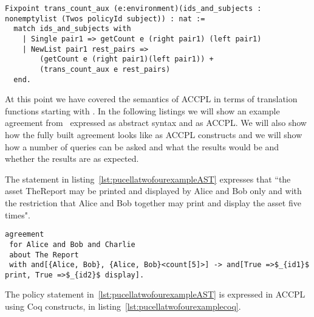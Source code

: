 \begin{minipage}[c]{0.95\textwidth}
\begin{lstlisting}
Fixpoint trans_count_aux (e:environment)(ids_and_subjects : nonemptylist (Twos policyId subject)) : nat :=
  match ids_and_subjects with
	| Single pair1 => getCount e (right pair1) (left pair1)
	| NewList pair1 rest_pairs =>
	    (getCount e (right pair1)(left pair1)) +
	    (trans_count_aux e rest_pairs)
  end.
\end{lstlisting}
\end{minipage}


At this point we have covered the semantics of \ac{ACCPL} in terms of translation functions starting with . In the following listings we will show an example agreement from~\cite{pucella2006} expressed as abstract syntax and as \ac{ACCPL}. We will also show how the fully built agreement looks like as \ac{ACCPL} constructs and we will show how a number of queries can be asked and what the results would be and whether the results are as expected.

The statement in listing~\ref{lst:pucellatwofourexampleAST} expresses that ``the asset TheReport may be printed and displayed by Alice and Bob only and with the restriction that Alice and Bob together may print and display the asset five times".

\lstset{language=Pucella2006}
\begin{minipage}[c]{0.95\textwidth}
\begin{lstlisting}[frame=single, caption={Agreement of Example 2.4}, label={lst:pucellatwofourexampleAST}, mathescape]
agreement
 for Alice and Bob and Charlie
 about The Report 
 with and[{Alice, Bob}, {Alice, Bob}<count[5]>] -> and[True =>$_{id1}$ print, True =>$_{id2}$ display].
\end{lstlisting}
\end{minipage} 

The policy statement in~\ref{lst:pucellatwofourexampleAST} is expressed in \ac{ACCPL} using Coq constructs, in listing~\ref{lst:pucellatwofourexamplecoq}.

